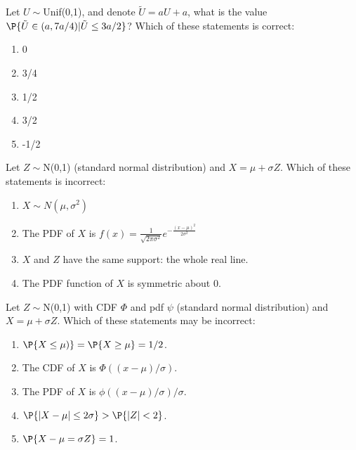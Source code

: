 \documentclass[poll_tutorial_format]{subfiles}
\begin{document}
	
	\begin{exercise}
	 	Let $U\sim $Unif(0,1), and denote $\tilde{U}=aU+a$, what is the value $\P{\tilde{U}\in(a,7a/4)|\tilde{U}\leq 3a/2}$?  
		Which of these statements is correct: 
		\begin{enumerate}
			\item 0
			\item 3/4
			\item 1/2
			\item 3/2
			\item -1/2 
		\end{enumerate}
	\end{exercise}
	
	
	\begin{exercise}
		Let $Z\sim$N(0,1) (standard normal distribution) and $X=\mu+\sigma Z$. 
		Which of these statements is incorrect: 
		\begin{enumerate}
			\item $X\sim N(\mu, \sigma^2)$
			\item The PDF of $X$ is $f(x)=\frac{1}{\sqrt{2\pi \sigma^2}} e^{-\frac{(x-\mu)^2 }{2\sigma^2 }}$
			\item $X$ and $Z$ have the same support: the whole real line.   
			\item The PDF function of $X$ is symmetric about 0.
		\end{enumerate}
	\end{exercise}
	

	\begin{exercise}
		Let $Z\sim$N(0,1) with CDF $\Phi$ and pdf $\psi$ (standard normal distribution) and $X=\mu+\sigma Z$. 
		Which of these statements may be incorrect: 
		\begin{enumerate}
			\item $\P{X\leq \mu)}=\P{X\geq \mu}=1/2$.
			\item The CDF of $X$ is $\Phi((x-\mu)/\sigma)$.
			\item The PDF of $X$ is $\phi((x-\mu)/\sigma)/\sigma$.
			\item $\P{|X-\mu|\leq 2\sigma} >\P{|Z|<2}$.
			\item $\P{X-\mu=\sigma Z}=1$.
		\end{enumerate}
	\end{exercise}
	
 
	
	
	
	
\end{document}
